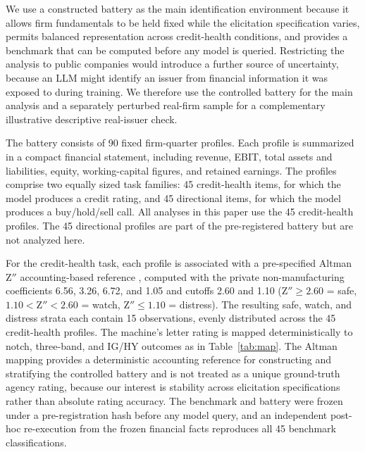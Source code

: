 \documentclass[a4paper,fleqn]{cas-sc}
\begin{document}
We use a constructed battery as the main identification environment because it allows firm fundamentals
to be held fixed while the elicitation specification varies, permits balanced representation across
credit-health conditions, and provides a benchmark that can be computed before any model is queried.
Restricting the analysis to public companies would introduce a further source of uncertainty,
because an LLM might identify an issuer from financial information it was exposed to during training. We
therefore use the controlled battery for the main analysis and a separately perturbed real-firm sample for a complementary illustrative descriptive real-issuer check.

The battery consists of 90 fixed firm-quarter profiles. Each profile is summarized in a compact financial
statement, including revenue, EBIT, total assets and liabilities, equity, working-capital figures, and
retained earnings. The profiles comprise two equally sized task families: 45 credit-health items, for
which the model produces a credit rating, and 45 directional items, for which the model produces a
buy/hold/sell call. All analyses in this paper use the 45 credit-health profiles. The 45 directional
profiles are part of the pre-registered battery but are not analyzed here.

For the credit-health task, each profile is associated with a pre-specified Altman Z$''$ accounting-based reference \citep{altman2005ems,altmanhotchkiss2006}, computed with the private non-manufacturing coefficients 6.56, 3.26, 6.72, and 1.05 and cutoffs 2.60 and
1.10 (Z$''\ge2.60$ = safe, $1.10<{}$Z$''<2.60$ = watch, Z$''\le1.10$ = distress). The resulting safe,
watch, and distress strata each contain 15 observations, evenly distributed across the 45 credit-health
profiles. The machine's letter rating is mapped deterministically to notch, three-band, and IG/HY
outcomes as in Table~\ref{tab:map}. The Altman mapping provides a deterministic accounting reference for
constructing and stratifying the controlled battery and is not treated as a unique ground-truth agency
rating, because our interest is stability across elicitation specifications rather than absolute rating
accuracy. The benchmark and battery were frozen under a pre-registration hash before any model query, and
an independent post-hoc re-execution from the frozen financial facts reproduces all 45 benchmark
classifications.
\end{document}
